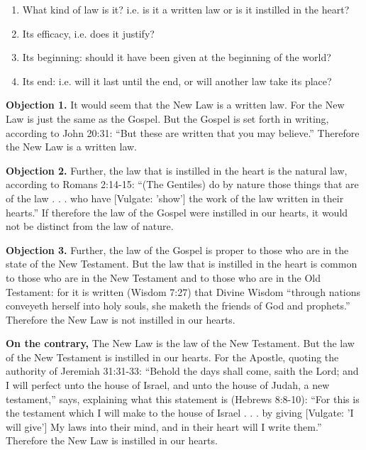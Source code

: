 

\begin{enumerate}

\item  What kind of law is it? i.e. is it a written law or is it instilled in the heart? 
\item  Its efficacy, i.e. does it justify? 
\item  Its beginning: should it have been given at the beginning of the world? 
\item  Its end: i.e. will it last until the end, or will another law take its place? 
\end{enumerate}


\textbf{Objection 1.} It would seem that the New Law is a written law. For the New Law is just the same as the Gospel. But the Gospel is set forth in writing, according to John 20:31: ``But these are written that you may believe.'' Therefore the New Law is a written law.

\textbf{Objection 2.} Further, the law that is instilled in the heart is the natural law, according to Romans 2:14-15: ``(The Gentiles) do by nature those things that are of the law . . . who have [Vulgate: 'show'] the work of the law written in their hearts.'' If therefore the law of the Gospel were instilled in our hearts, it would not be distinct from the law of nature.

\textbf{Objection 3.} Further, the law of the Gospel is proper to those who are in the state of the New Testament. But the law that is instilled in the heart is common to those who are in the New Testament and to those who are in the Old Testament: for it is written (Wisdom 7:27) that Divine Wisdom ``through nations conveyeth herself into holy souls, she maketh the friends of God and prophets.'' Therefore the New Law is not instilled in our hearts.

\textbf{On the contrary,} The New Law is the law of the New Testament. But the law of the New Testament is instilled in our hearts. For the Apostle, quoting the authority of Jeremiah 31:31-33: ``Behold the days shall come, saith the Lord; and I will perfect unto the house of Israel, and unto the house of Judah, a new testament,'' says, explaining what this statement is (Hebrews 8:8-10): ``For this is the testament which I will make to the house of Israel . . . by giving [Vulgate: 'I will give'] My laws into their mind, and in their heart will I write them.'' Therefore the New Law is instilled in our hearts.

